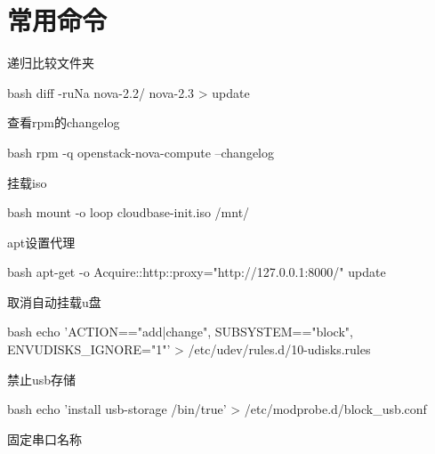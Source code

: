 \section{常用命令}
\begin{outline}[enumerate]
\1 递归比较文件夹
\begin{code-block}{bash}
diff -ruNa nova-2.2/ nova-2.3 > update
\end{code-block}

\1 查看rpm的changelog
\begin{code-block}{bash}
rpm -q openstack-nova-compute --changelog
\end{code-block}

\1 挂载iso
\begin{code-block}{bash}
mount -o loop cloudbase-init.iso /mnt/
\end{code-block}

\1 apt设置代理
\begin{code-block}{bash}
apt-get -o Acquire::http::proxy="http://127.0.0.1:8000/" update
\end{code-block}

\1 取消自动挂载u盘
\begin{code-block}{bash}
echo 'ACTION=="add|change", SUBSYSTEM=="block", ENV{UDISKS_IGNORE}="1"' > /etc/udev/rules.d/10-udisks.rules
\end{code-block}

\1 禁止usb存储
\begin{code-block}{bash}
echo 'install usb-storage /bin/true' > /etc/modprobe.d/block_usb.conf
\end{code-block}

\1 固定串口名称


\end{outline}
